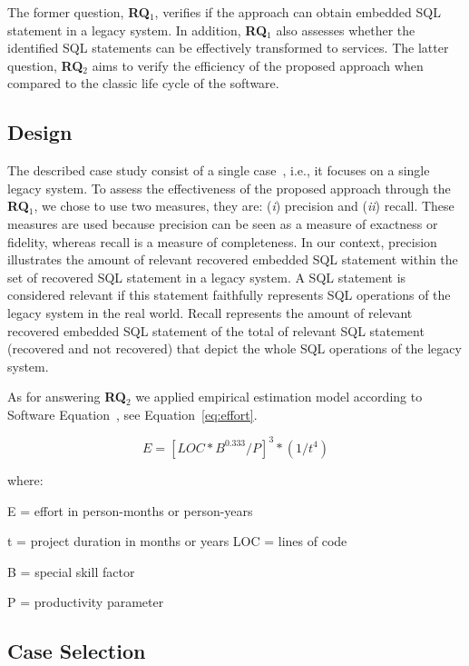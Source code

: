 \documentclass[a4paper,twoside]{article}
\begin{document}
The former question, \textbf{RQ$_1$}, verifies if the approach can obtain embedded SQL statement in a legacy system. In addition, \textbf{RQ$_1$} also assesses whether the identified SQL statements can be effectively transformed to services. The latter question, \textbf{RQ$_2$} aims to verify the efficiency of the proposed approach when compared to the classic life cycle of the software.

\subsection{Design} %
\label{sub:design_case_study}

The described case study consist of a single case~\cite{citeulike:598898}, i.e., it focuses on a single legacy system. To assess the effectiveness of the proposed approach through the \textbf{RQ$_1$}, we chose to use two measures, they are: (\textit{i}) precision and (\textit{ii}) recall. These measures are used because precision can be seen as a measure of exactness or fidelity, whereas recall is a measure of completeness. In our context, precision illustrates the amount of relevant recovered embedded SQL statement within the set of recovered SQL statement in a legacy system. A SQL statement is considered relevant if this statement faithfully represents SQL operations of the legacy system in the real world. Recall represents the amount of relevant recovered embedded SQL statement of the total of relevant SQL statement (recovered and not recovered) that depict the whole SQL operations of the legacy system.

As for answering \textbf{RQ$_2$} we applied empirical estimation model according to Software Equation~\cite{Putnam:1991:MER:574087}, see Equation~\ref{eq:effort}. 

\begin{equation}
  E = [LOC * B^{0.333}/P]^3 * (1/t^4)
  \label{eq:effort}
\end{equation}

where:

E = effort in person-months or person-years 

t = project duration in months or years LOC = lines of code

B = special skill factor

P = productivity parameter


\subsection{Case Selection} %
\label{sub:case_selection}
\end{document}
